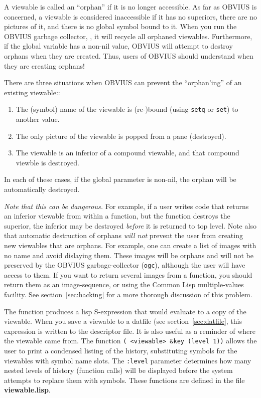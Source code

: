 A viewable is called an ``orphan'' if it is no longer accessible.  As
far as OBVIUS is concerned, a viewable is considered inaccessible if
it has no superiors, there are no pictures of it, and there is no
global symbol bound to it.  When you run the OBVIUS garbage collector,
, it will recycle all orphaned viewables.  Furthermore, if
the global variable  has a non-nil value,
OBVIUS will attempt to destroy orphans when they are created.  Thus,
users of OBVIUS should understand when they are creating orphans!

There are three situations when OBVIUS can prevent the ``orphan'ing'' of
an existing viewable::
\begin{enumerate}
\item The (symbol) name of the viewable is (re-)bound (using {\tt setq} or
{\tt set}) to another value.
\item The only picture of the viewable is popped from a pane (destroyed).
\item The viewable is an inferior of a compound viewable, and that
compound viewble is destroyed.
\end{enumerate}
In each of these cases, if the global parameter
 is non-nil, the orphan will be
automatically destroyed.  

{\em Note that this can be dangerous.} For example, if a user writes
code that returns an inferior viewable from within a function, but the
function destroys the superior, the inferior may be destroyed {\em
before} it is returned to top level.  Note also that automatic
destruction of orphans {\em will not} prevent the user from creating
new viewables that are orphans.  For example, one can create a list of
images with no name and avoid dislaying them.  These images will be
orphans and will not be preserved by the OBVIUS garbage-collector
({\tt ogc}), although the user will have access to them.  If you want
to return several images from a function, you should return them as an
image-sequence, or using the Common Lisp multiple-values facility.
See section~\ref{sec:hacking} for a more thorough discussion of this
problem.

The  function produces a lisp S-expression that
would evaluate to a copy of the viewable.  When you save a viewable to
a datfile (see section~\ref{sec:datfile}, this expression is written
to the descriptor file.  It is also useful as a reminder of where the
viewable came from.  The function {\tt ( <viewable>
\&key (level 1))} allows the user to print a condensed listing of the
history, substituting symbols for the viewables with symbol name
slots.  The {\tt :level} parameter determines how many nested levels
of history (function calls) will be displayed before the system
attempts to replace them with symbols.  These functions are defined in
the file {\bf viewable.lisp}.


